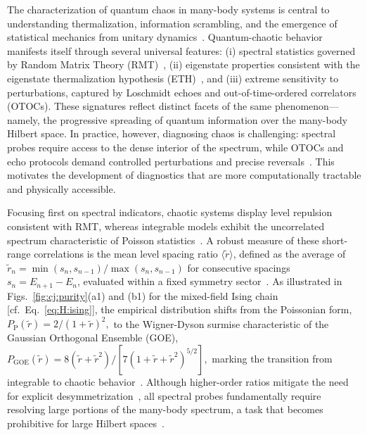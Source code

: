 \documentclass[pra,twocolumn,aps,showpacs,superscriptaddress,longbibliography]{revtex4-2}
\begin{document}
The characterization of quantum chaos in many-body systems is central to understanding thermalization, information scrambling, and the emergence of statistical mechanics from unitary dynamics~\cite{dalessio_2016_quantum}. Quantum-chaotic behavior manifests itself through several universal features: (i) spectral statistics governed by Random Matrix Theory (RMT)~\cite{bohigas_1984_characterization}, (ii) eigenstate properties consistent with the eigenstate thermalization hypothesis (ETH)~\cite{deutsch_1991_quantum}, and (iii) extreme sensitivity to perturbations, captured by Loschmidt echoes and out-of-time-ordered correlators (OTOCs). These signatures reflect distinct facets of the same phenomenon—namely, the progressive spreading of quantum information over the many-body Hilbert space. In practice, however, diagnosing chaos is challenging: spectral probes require access to the dense interior of the spectrum, while OTOCs and echo protocols demand controlled perturbations and precise reversals~\cite{bardarson2012unbounded,santos2010onset,alba2017entanglement,smith2016many}. This motivates the development of diagnostics that are more computationally tractable and physically accessible.

Focusing first on spectral indicators, chaotic systems display level repulsion consistent with RMT, whereas integrable models exhibit the uncorrelated spectrum characteristic of Poisson statistics~\cite{berry_1977_level}. A robust measure of these short-range correlations is the mean level spacing ratio $\langle \tilde{r} \rangle$, defined as the average of $\tilde{r}_n = \min(s_n, s_{n-1})/\max(s_n, s_{n-1})$ for consecutive spacings $s_n = E_{n+1} - E_n$, evaluated within a fixed symmetry sector~\cite{oganesyan_2007_localization}. As illustrated in Figs.~\ref{fig:cj:purity}(a1) and (b1) for the mixed-field Ising chain [cf.~Eq.~\eqref{eq:H:ising}], the empirical distribution shifts from the Poissonian form,
\(
P_{\text{P}}(\tilde{r}) = 2/(1+\tilde{r})^2,
\)
to the Wigner-Dyson surmise characteristic of the Gaussian Orthogonal Ensemble (GOE),
\(
P_{\text{GOE}}(\tilde{r}) = 8(\tilde{r} + \tilde{r}^2) / [7(1+\tilde{r}+\tilde{r}^2)^{5/2}],
\)
marking the transition from integrable to chaotic behavior~\cite{atas_2013_distribution}.  
Although higher-order ratios mitigate the need for explicit desymmetrization~\cite{tekur_2020_symmetry}, all spectral probes fundamentally require resolving large portions of the many-body spectrum, a task that becomes prohibitive for large Hilbert spaces~\cite{scialchi_2024_integrabilitytochaos, bernien2017probing, huang2020predicting, brydges2019probing}.
\end{document}
